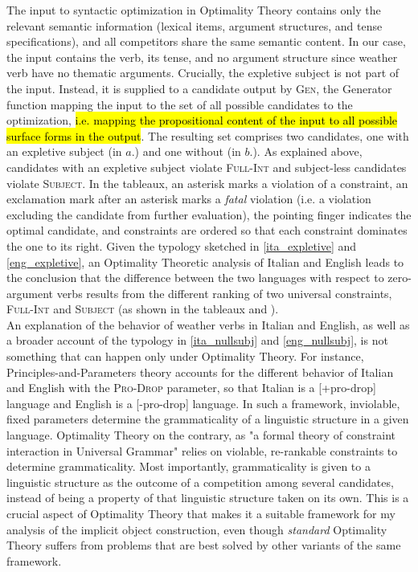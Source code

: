 The input to syntactic optimization in Optimality Theory contains only the relevant semantic information (lexical items, argument structures, and tense specifications), and all competitors share the same semantic content. In our case, the input contains the verb, its tense, and no argument structure since weather verb have no thematic arguments. Crucially, the expletive subject is not part of the input. Instead, it is supplied to a candidate output by \textsc{Gen}, the Generator function mapping the input to the set of all possible candidates to the optimization, \hl{i.e. mapping the propositional content of the input to all possible surface forms in the output}. The resulting set comprises two candidates, one with an expletive subject (in $a.$) and one without (in $b.$). As explained above, candidates with an expletive subject violate \textsc{Full-Int} and subject-less candidates violate \textsc{Subject}. In the tableaux, an asterisk marks a violation of a constraint, an exclamation mark after an asterisk marks a \textit{fatal} violation (i.e. a violation excluding the candidate from further evaluation), the pointing finger indicates the optimal candidate, and constraints are ordered so that each constraint dominates the one to its right. Given the typology sketched in \ref{ita_expletive} and \ref{eng_expletive}, an Optimality Theoretic analysis of Italian and English leads to the conclusion that the difference between the two languages with respect to zero-argument verbs results from the different ranking of two universal constraints, \textsc{Full-Int} and \textsc{Subject} (as shown in the tableaux   and ).\\
An explanation of the behavior of weather verbs in Italian and English, as well as a broader account of the typology in \ref{ita_nullsubj} and \ref{eng_nullsubj}, is not something that can happen only under Optimality Theory. For instance, Principles-and-Parameters theory accounts for the different behavior of Italian and English with the \textsc{Pro-Drop} parameter, so that Italian is a [+pro-drop] language and English is a [-pro-drop] language. In such a framework, inviolable, fixed parameters determine the grammaticality of a linguistic structure in a given language. Optimality Theory on the contrary, as "a formal theory of constraint interaction in Universal Grammar" \parencite{legendre2001introduction} relies on violable, re-rankable constraints to determine grammaticality. Most importantly, grammaticality is given to a linguistic structure as the outcome of a competition among several candidates, instead of being a property of that linguistic structure taken on its own. This is a crucial aspect of Optimality Theory that makes it a suitable framework for my analysis of the implicit object construction, even though \textit{standard} Optimality Theory suffers from problems that are best solved by other variants of the same framework. %
